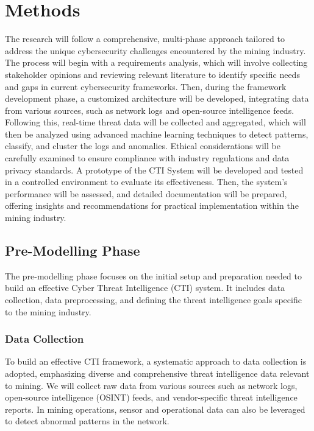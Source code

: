 \documentclass[a4paper,twoside,12pt]{report}
\begin{document}
\section{Methods} \label{sec:phases}
The research will follow a comprehensive, multi-phase approach tailored to address the unique cybersecurity challenges encountered by the mining industry. The process will begin with a requirements analysis, which will involve collecting stakeholder opinions and reviewing relevant literature to identify specific needs and gaps in current cybersecurity frameworks. Then, during the framework development phase, a customized architecture will be developed, integrating data from various sources, such as network logs and open-source intelligence feeds. Following this, real-time threat data will be collected and aggregated, which will then be analyzed using advanced machine learning techniques to detect patterns, classify, and cluster the logs and anomalies. Ethical considerations will be carefully examined to ensure compliance with industry regulations and data privacy standards. A prototype of the CTI System will be developed and tested in a controlled environment to evaluate its effectiveness. Then, the system’s performance will be assessed, and detailed documentation will be prepared, offering insights and recommendations for practical implementation within the mining industry.

\subsection{Pre-Modelling Phase} 
The pre-modelling phase focuses on the initial setup and preparation needed to build an effective Cyber Threat Intelligence (CTI) system. It includes data collection, data preprocessing, and defining the threat intelligence goals specific to the mining industry.

\subsubsection{Data Collection}

To build an effective CTI framework, a systematic approach to data collection is adopted, emphasizing diverse and comprehensive threat intelligence data relevant to mining. We will collect raw data from various sources such as network logs, open-source intelligence (OSINT) feeds, and vendor-specific threat intelligence reports. In mining operations, sensor and operational data can also be leveraged to detect abnormal patterns in the network.
\end{document}
